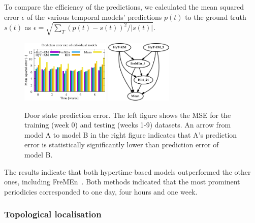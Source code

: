 To compare the efficiency of the predictions, we calculated the mean squared error $\epsilon$ of the various temporal models' predictions $p(t)$ to the ground truth $s(t)$ as $\epsilon=\sqrt{\sum_T{(p(t)-s(t))^2}/|s(t)|}$.
%
\begin{figure}[!ht]
   \begin{center}
      \hfill
      \includegraphics[height=3.0cm]{fig/door_graph}
      \hfill
      \includegraphics[height=3.0cm]{fig/door_stat}
      \hfill
      \caption{Door state prediction error. The left figure shows the MSE for the training (week 0) and testing (weeks 1-9) datasets. An arrow from model A to model B in the right figure indicates that A's prediction error is statistically significantly lower than prediction error of model B.\label{fig:binary}}
   \end{center}
\end{figure}
%
The results indicate that both hypertime-based models outperformed the other ones, including FreMEn~\cite{fremen}.
Both methods indicated that the most prominent periodicies corresponded to one day, four hours and one week. 

\subsubsection{Topological localisation}

